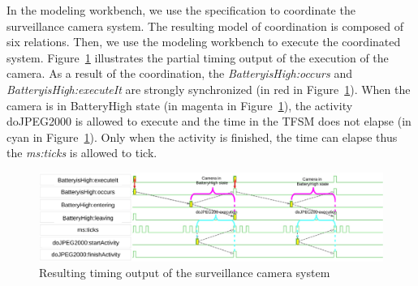 In the modeling workbench, we use the \bflow specification to coordinate the surveillance camera system. The resulting model of coordination is composed of six \ccsl relations. Then, we use the modeling workbench to execute the coordinated system. Figure~\ref{fig:camerasystem} illustrates the partial timing output of the execution of the camera. As a result of the coordination, the \mse \emph{BatteryisHigh:occurs} and \emph{BatteryisHigh:executeIt} are strongly synchronized (in red in Figure~\ref{fig:camerasystem}). When the camera is in BatteryHigh state (in magenta in Figure~\ref{fig:camerasystem}), the activity doJPEG2000 is allowed to execute and the time in the TFSM does not elapse (in cyan in Figure~\ref{fig:camerasystem}). Only when the activity is finished, the time can elapse thus the \mse \emph{ms:ticks} is allowed to tick. 
		\begin{figure}[h]
			\center
			\includegraphics[width=1\columnwidth]{examples/figs/vcdcamera}
			\caption{Resulting timing output of the surveillance camera system}
			\label{fig:camerasystem}
		\end{figure}


